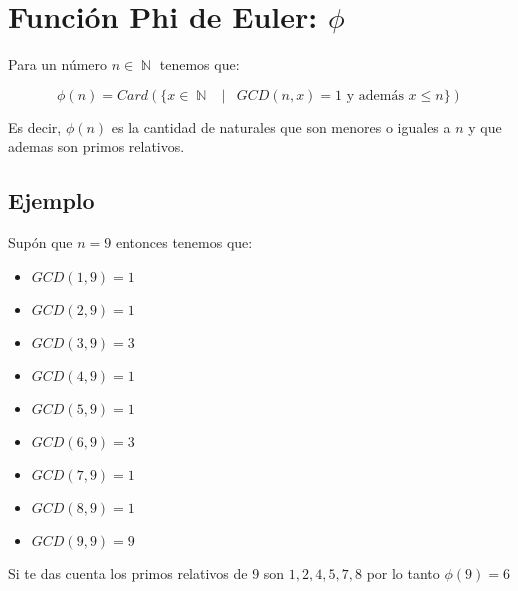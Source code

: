 \documentclass[12pt, fleqn]{report}                             %
\DeclareMathOperator \Space {\quad}                             %
\DeclareMathOperator \MiniSpace {\;}                            %
\newcommand \Such {\MiniSpace|\MiniSpace}                       %
\DeclareMathOperator \Naturals  {\mathbb{N}}                     %
\begin{document}
    \clearpage
    \section{Función Phi de Euler: $\phi$ }

        Para un número $n \in \Naturals$ tenemos que:

        \begin{equation}
            \phi(n) = 
                Card(
                    \{ x \in \Naturals \Such
                        GCD(n, x) = 1
                        \text{ y además } x \leq n
                    \}
                )
        \end{equation}
 
        Es decir, $\phi(n)$ es la cantidad de naturales que son menores o iguales a
        $n$ y que ademas son primos relativos.




        \clearpage
        \subsection{Ejemplo}
            
            Supón que $n=9$ entonces tenemos que:

            \begin{itemize}
                \item $GCD(1, 9) = 1$
                \item $GCD(2, 9) = 1$
                \item $GCD(3, 9) = 3$
                \item $GCD(4, 9) = 1$
                \item $GCD(5, 9) = 1$
                \item $GCD(6, 9) = 3$
                \item $GCD(7, 9) = 1$
                \item $GCD(8, 9) = 1$
                \item $GCD(9, 9) = 9$
            \end{itemize}

            Si te das cuenta los primos relativos de 9 son $1,2,4,5,7,8$
            por lo tanto $\phi(9) = 6$
\end{document}
